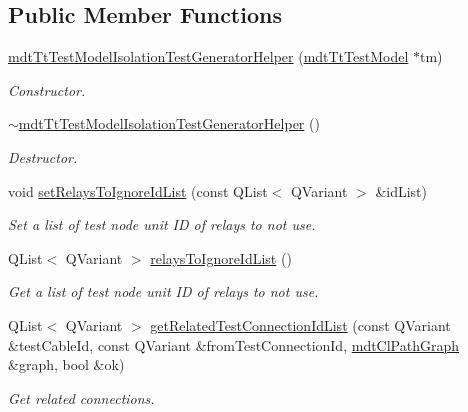 \subsection*{Public Member Functions}
\begin{DoxyCompactItemize}
\item 
\hyperlink{classmdt_tt_test_model_isolation_test_generator_helper_a083345ab2dea09d5f94aaf02c2e459bc}{mdt\-Tt\-Test\-Model\-Isolation\-Test\-Generator\-Helper} (\hyperlink{classmdt_tt_test_model}{mdt\-Tt\-Test\-Model} $\ast$tm)
\begin{DoxyCompactList}\small\item\em Constructor. \end{DoxyCompactList}\item 
\hyperlink{classmdt_tt_test_model_isolation_test_generator_helper_ab9cb45f2fad6b83c9f6db251d13a2166}{$\sim$mdt\-Tt\-Test\-Model\-Isolation\-Test\-Generator\-Helper} ()
\begin{DoxyCompactList}\small\item\em Destructor. \end{DoxyCompactList}\item 
void \hyperlink{classmdt_tt_test_model_isolation_test_generator_helper_a3cef48d61b7783cb6d139a73ee1fcee9}{set\-Relays\-To\-Ignore\-Id\-List} (const Q\-List$<$ Q\-Variant $>$ \&id\-List)
\begin{DoxyCompactList}\small\item\em Set a list of test node unit I\-D of relays to not use. \end{DoxyCompactList}\item 
Q\-List$<$ Q\-Variant $>$ \hyperlink{classmdt_tt_test_model_isolation_test_generator_helper_a7bc7afdfeb0f87abdbed39f51bdff4e1}{relays\-To\-Ignore\-Id\-List} ()
\begin{DoxyCompactList}\small\item\em Get a list of test node unit I\-D of relays to not use. \end{DoxyCompactList}\item 
Q\-List$<$ Q\-Variant $>$ \hyperlink{classmdt_tt_test_model_isolation_test_generator_helper_a36c83afcee89bc02023876bbad514cc5}{get\-Related\-Test\-Connection\-Id\-List} (const Q\-Variant \&test\-Cable\-Id, const Q\-Variant \&from\-Test\-Connection\-Id, \hyperlink{classmdt_cl_path_graph}{mdt\-Cl\-Path\-Graph} \&graph, bool \&ok)
\begin{DoxyCompactList}\small\item\em Get related connections. \end{DoxyCompactList}\item 

\end{DoxyCompactItemize}
